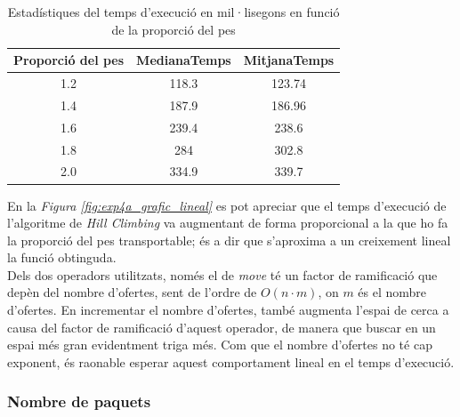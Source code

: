 \documentclass[a4paper]{article}
\begin{document}
		\begin{table}[H]
		\centering
		\begin{tabular}{|c|c|c|}
			\hline
			\textbf{Proporció del pes} & \textbf{MedianaTemps} & \textbf{MitjanaTemps} \\
			\hline
			1.2 & 118.3 & 123.74\\
			\hline
			1.4 & 187.9 & 186.96\\
			\hline
			1.6 & 239.4 & 238.6\\
			\hline
			1.8 & 284 & 302.8\\
			\hline
			2.0 & 334.9 & 339.7\\
			\hline
		\end{tabular}
		\caption{Estadístiques del temps d'execució en mil·lisegons en funció de la proporció del pes}
		\label{tab:exp4a_taula}
	\end{table}
	
	En la \textit{Figura \ref{fig:exp4a_grafic_lineal}} es pot apreciar que el temps d'execució de l'algoritme de \textit{Hill Climbing} va augmentant de forma proporcional a la que ho fa la proporció del pes transportable; és a dir que s'aproxima a un creixement lineal la funció obtinguda. \\
	
	Dels dos operadors utilitzats, només el de \textit{move} té un factor de ramificació que depèn del nombre d'ofertes, sent de l'ordre de $O(n \cdot m)$, on $m$ és el nombre d'ofertes. En incrementar el nombre d'ofertes, també augmenta l'espai de cerca a causa del factor de ramificació d'aquest operador, de manera que buscar en un espai més gran evidentment triga més. Com que el nombre d'ofertes no té cap exponent, és raonable esperar aquest comportament lineal en el temps d'execució.

	\subsubsection{Nombre de paquets}
	\label{sec:exp4b_nombrePaq}
	
\end{document}
